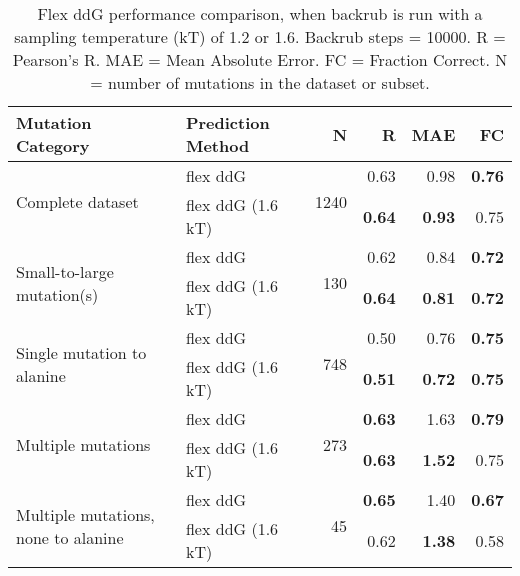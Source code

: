 \begin{table}
  \begin{tabular}{llrrrr}
\toprule
Mutation Category &  Prediction Method &     N &    R &  MAE &   FC \\
\midrule
 \multirow{ 2}{*}{Complete dataset} & flex ddG & \multirow{ 2}{*}{1240} & 0.63 & 0.98 & \textbf{0.76}  \\
 & flex ddG (1.6 kT) & & \textbf{0.64} & \textbf{0.93} & 0.75  \\
\hline
 \multirow{ 2}{*}{Small-to-large mutation(s)} & flex ddG & \multirow{ 2}{*}{130} & 0.62 & 0.84 & \textbf{0.72}  \\
 & flex ddG (1.6 kT) & & \textbf{0.64} & \textbf{0.81} & \textbf{0.72}  \\
\hline
 \multirow{ 2}{*}{Single mutation to alanine} & flex ddG & \multirow{ 2}{*}{748} & 0.50 & 0.76 & \textbf{0.75}  \\
 & flex ddG (1.6 kT) & & \textbf{0.51} & \textbf{0.72} & \textbf{0.75}  \\
\hline
 \multirow{ 2}{*}{Multiple mutations} & flex ddG & \multirow{ 2}{*}{273} & \textbf{0.63} & 1.63 & \textbf{0.79}  \\
 & flex ddG (1.6 kT) & & \textbf{0.63} & \textbf{1.52} & 0.75  \\
\hline
 \multirow{ 2}{*}{Multiple mutations, none to alanine} & flex ddG & \multirow{ 2}{*}{45} & \textbf{0.65} & 1.40 & \textbf{0.67}  \\
 & flex ddG (1.6 kT) & & 0.62 & \textbf{1.38} & 0.58  \\
\bottomrule
\end{tabular}
  \caption[Comparison of backrub temperature results]{
    Flex ddG performance comparison, when backrub is run with a sampling temperature (kT) of 1.2 or 1.6. Backrub steps = 10000. R = Pearson's R. MAE = Mean Absolute Error. FC = Fraction Correct. N = number of mutations in the dataset or subset.
  } \label{tab:table-temperature}
\end{table}
